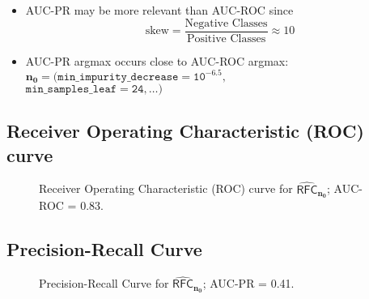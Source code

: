 \documentclass[handout]{beamer}
\begin{document}
\begin{frame}
 \begin{figure}[p]
\begin{center}

\end{center}
\end{figure}
\begin{itemize}
\item AUC-PR may be more relevant than AUC-ROC since
\begin{equation*}
\text{skew} = \frac{\text{Negative Classes}}{\text{Positive Classes}} \approx 10 
\end{equation*}
\item AUC-PR argmax occurs close to AUC-ROC argmax: 
$\mathbf{n_0} = (\mathtt{min\_impurity\_decrease = 10^{-6.5}},$\\
  $\mathtt{min\_samples\_leaf = 24},
 \ldots )$

\end{itemize}
\end{frame}


\subsection{Receiver Operating Characteristic (ROC) curve}

\begin{frame}
 \begin{figure}[p]
\centering
\caption[ROC Curve]{Receiver Operating Characteristic (ROC) curve for 
$\operatorname{\widehat{\mathsf{RFC}}}_\mathbf{n_0}$; AUC-ROC = 0.83.}
\label{fig:roc}
\end{figure}
\end{frame}

\subsection{Precision-Recall Curve}

\begin{frame}
\begin{figure}[p]
\centering
\caption[Precision-Recall Curve]{Precision-Recall Curve for 
$\operatorname{\widehat{\mathsf{RFC}}}_\mathbf{n_0}$; AUC-PR = 0.41.}
\label{fig:precision-recall}
\end{figure}
\end{frame}
\end{document}
